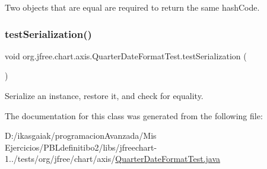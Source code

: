 Two objects that are equal are required to return the same hash\+Code. \mbox{\label{classorg_1_1jfree_1_1chart_1_1axis_1_1_quarter_date_format_test_a05c5f89d33521f7ebbea4187286f9c1e}} 
\subsubsection{\texorpdfstring{test\+Serialization()}{testSerialization()}}
{\footnotesize\ttfamily void org.\+jfree.\+chart.\+axis.\+Quarter\+Date\+Format\+Test.\+test\+Serialization (\begin{DoxyParamCaption}{ }\end{DoxyParamCaption})}

Serialize an instance, restore it, and check for equality. 

The documentation for this class was generated from the following file\+:\begin{DoxyCompactItemize}
\item 
D\+:/ikasgaiak/programacion\+Avanzada/\+Mis Ejercicios/\+P\+B\+Ldefinitibo2/libs/jfreechart-\/1../tests/org/jfree/chart/axis/\mbox{\hyperlink{_quarter_date_format_test_8java}{Quarter\+Date\+Format\+Test.\+java}}\end{DoxyCompactItemize}
